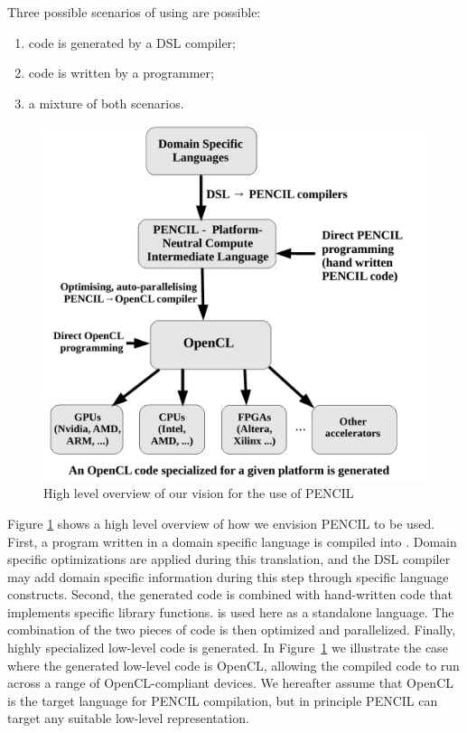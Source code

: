 Three possible scenarios of using \pencil are possible:
\begin{enumerate}
\item \pencil code is generated by a DSL compiler;
\item \pencil code is written by a programmer;
\item a mixture of both scenarios.
\end{enumerate}

\begin{figure}[ht]
{
 \centering
 \includegraphics[scale=0.65]{./figures/CARPHighLevelOverview.pdf}
 \caption{High level overview of our vision for the use of PENCIL}
 \label{fig-pencil-high-level-picture}
} 
\end{figure}

Figure \ref{fig-pencil-high-level-picture} shows a high level
overview of how we envision PENCIL to be used.
First, a program written in a domain
specific language is compiled into \pencil.  Domain specific
optimizations are applied during this translation, and the DSL compiler may
add domain specific information during this step through specific \pencil
language
constructs.  Second, the generated \pencil code is combined with
hand-written \pencil code that implements specific library
functions.  \pencil is used here as a standalone language.  The
combination of the two pieces of code is then optimized and
parallelized.  Finally, 
highly specialized low-level code is generated.
In Figure~\ref{fig-pencil-high-level-picture} we 
illustrate the case where the generated low-level code is OpenCL, 
allowing the compiled code to run across a range of OpenCL-compliant 
devices.  We hereafter assume that OpenCL is the target language for 
PENCIL compilation, but in principle PENCIL can target any suitable 
low-level representation.

